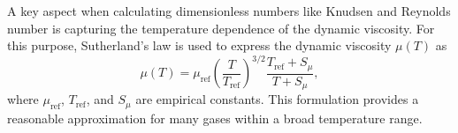 A key aspect when calculating dimensionless numbers like Knudsen and Reynolds number is capturing the temperature dependence of the dynamic viscosity.
For this purpose, Sutherland's law is used to express the dynamic viscosity $\mu(T)$ as 
\begin{equation}
  \mu(T)
  = \mu_{\text{ref}}
    \left(\frac{T}{T_{\text{ref}}}\right)^{3/2}
    \frac{T_{\text{ref}} + S_\mu}{T + S_\mu},
	\label{eq:sutherland}
\end{equation}
where $\mu_{\text{ref}}$, $T_{\text{ref}}$, and $S_\mu$ are empirical constants.
This formulation provides a reasonable approximation for many gases within a broad temperature range.


